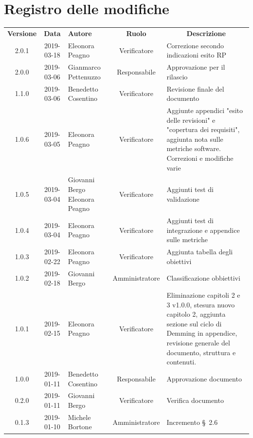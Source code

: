 \documentclass[11pt,a4paper]{article}
\begin{document}
	
	\newpage
	{\def\arraystretch{2}\tabcolsep=10pt
	
	\section*{\centering Registro delle modifiche}
	\begin{tabularx}{\textwidth}{ c | c | p{3.5cm} | c | X }
		\rowcolor{LightBlue}
		\color{white}\bfseries Versione & \color{white}\bfseries Data & \color{white}\bfseries Autore & \color{white}\bfseries Ruolo & \multicolumn{1}{c}{\color{white}\bfseries Descrizione}\\[0.25cm]
		2.0.1 & 2019-03-18 & Eleonora Peagno & Verificatore & Correzione secondo indicazioni esito RP \\ \hline
		2.0.0 & 2019-03-06 & Gianmarco Pettenuzzo & Responsabile & Approvazione per il rilascio \\ \hline
		1.1.0 & 2019-03-06 & Benedetto Cosentino & Verificatore & Revisione finale del documento \\ \hline
		1.0.6 & 2019-03-05 & Eleonora Peagno & Verificatore & Aggiunte appendici "esito delle revisioni" e "copertura dei requisiti", aggiunta nota sulle metriche software. Correzioni e modifiche varie \\ \hline
		1.0.5 & 2019-03-04 & Giovanni Bergo \newline Eleonora Peagno & Verificatore & Aggiunti test di validazione \\ \hline
		1.0.4 & 2019-03-04 & Eleonora Peagno & Verificatore & Aggiunti test di integrazione e appendice sulle metriche \\ \hline
		1.0.3 & 2019-02-22 & Eleonora Peagno & Verificatore & Aggiunta tabella degli obiettivi \\ \hline
		1.0.2 & 2019-02-18 & Giovanni Bergo & Amministratore & Classificazione obbiettivi\\ \hline
		1.0.1 & 2019-02-15 & Eleonora Peagno & Verificatore & Eliminazione capitoli 2 e 3 v1.0.0, stesura nuovo capitolo 2, aggiunta sezione sul ciclo di Demming in appendice, revisione generale del documento, struttura e contenuti. \\ \hline
		1.0.0 & 2019-01-11 & Benedetto Cosentino & Responsabile & Approvazione documento\\ \hline
		0.2.0 & 2019-01-11 & Giovanni Bergo & Verificatore & Verifica documento\\ \hline
		0.1.3 & 2019-01-10 & Michele Bortone & Amministratore & Incremento \S\ 2.6\\ \hline

\end{tabularx}}
\end{document}
